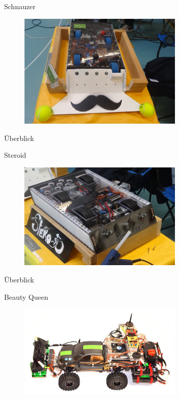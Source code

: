 \documentclass{beamer}
\begin{document}
\begin{frame}{Schnauzer}
 \begin{figure}[H]
  \centering
  \includegraphics[width=0.7\textwidth]{./images/robot-schnauzer.jpg}
 \end{figure}
\end{frame}
\begin{frame}{\"Uberblick}
	
\end{frame}
\begin{frame}{Steroid}
 \begin{figure}[H]
  \centering
  \includegraphics[width=0.7\textwidth]{./images/robot-steroid.jpg}
 \end{figure}
\end{frame}
\begin{frame}{\"Uberblick}
	
\end{frame}
\begin{frame}{Beauty Queen}
 \begin{figure}[H]
  \centering
  \includegraphics[width=0.7\textwidth]{./images/robot-beauty-queen.jpg}
 \end{figure}
\end{frame}
\end{document}
